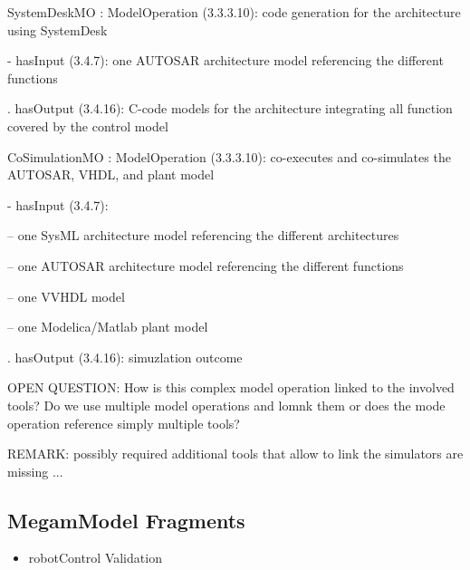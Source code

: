 {SystemDeskMO : ModelOperation (3.3.3.10): code generation for the architecture using SystemDesk

- hasInput (3.4.7): one AUTOSAR architecture model referencing the different functions

. hasOutput (3.4.16):  C-code models for the architecture integrating all function covered by the control model

CoSimulationMO : ModelOperation (3.3.3.10): co-executes and co-simulates the AUTOSAR, VHDL, and plant model

- hasInput (3.4.7): 

-- one SysML architecture model referencing the different architectures

-- one AUTOSAR architecture model referencing the different functions

-- one VVHDL  model 

-- one Modelica/Matlab plant model 

. hasOutput (3.4.16):  simuzlation outcome

OPEN QUESTION: How is this complex model operation linked to the involved tools? Do we use multiple model operations and lomnk them or does the mode operation reference simply multiple tools?

REMARK: possibly required additional tools that allow to link the simulators are missing ...

\subsection*{MegamModel Fragments}
\begin{itemize}
    \item robotControl Validation
\end{itemize}

%
}

